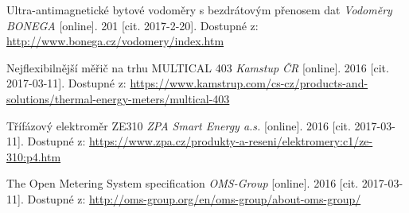 \begin{literatura}{99}
 Ultra-antimagnetické bytové vodoměry s bezdrátovým přenosem dat \textit{Vodoměry BONEGA} [online]. 201 [cit. 2017-2-20]. Dostupné z: \url{http://www.bonega.cz/vodomery/index.htm}

 Nejflexibilnější měřič na trhu MULTICAL 403 \textit{Kamstup ČR} [online]. 2016 [cit. 2017-03-11]. Dostupné z: \url{https://www.kamstrup.com/cs-cz/products-and-solutions/thermal-energy-meters/multical-403}

 Třífázový elektroměr ZE310 \textit{ZPA Smart Energy a.s.} [online]. 2016 [cit. 2017-03-11]. Dostupné z: \url{https://www.zpa.cz/produkty-a-reseni/elektromery:c1/ze-310:p4.htm}

 The Open Metering System specification \textit{OMS-Group} [online]. 2016 [cit. 2017-03-11]. Dostupné z: \url{http://oms-group.org/en/oms-group/about-oms-group/}




\end{literatura}

